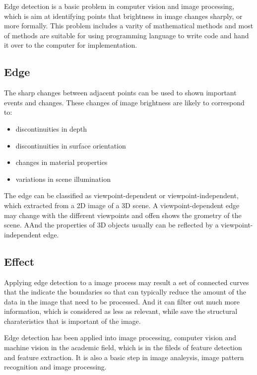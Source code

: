 \documentclass[10pt,twocolumn,letterpaper]{article}
\begin{document}
Edge detection is a basic problem in computer vision and image processing, 
which is aim at identifying points that brightness in image changes 
sharply, or more formally. This problem includes a varity of mathematical 
methods and most of methods are suitable for using programming language 
to write code and hand it over to the computer for implementation.

\subsection{Edge}

The sharp changes between adjacent points can be used to shown important 
events and changes. These changes of image brightness are likely to 
correspond to:\cite{ref1} 

\begin{itemize}[noitemsep]
\item discontinuities in depth
\item discontinuities in surface orientation
\item changes in material properties
\item variations in scene illumination
\end{itemize}

The edge can be classified as viewpoint-dependent or viewpoint-independent, 
which extracted from a 2D image of a 3D scene. A viewpoint-dependent edge 
may change with the different viewpoints and offen shows the grometry of 
the scene. AAnd the properties of 3D objects usually can be reflected by a 
viewpoint-independent edge.

\subsection{Effect}

Applying edge detection to a image process may result a set of connected 
curves that the indicate the boundaries so that can typically reduce the 
amount of the data in the image that need to be processed. And it can filter out 
much more information, which is considered as less as relevant, while save the 
structural charateristics that is important of the image.

Edge detection has been applied into image processing, computer vision and machine 
vision in the academic field, which is in the fileds of feature detection and 
feature extraction. It is also a basic step in image analeysis, image pattern 
recognition and image processing.
\end{document}
